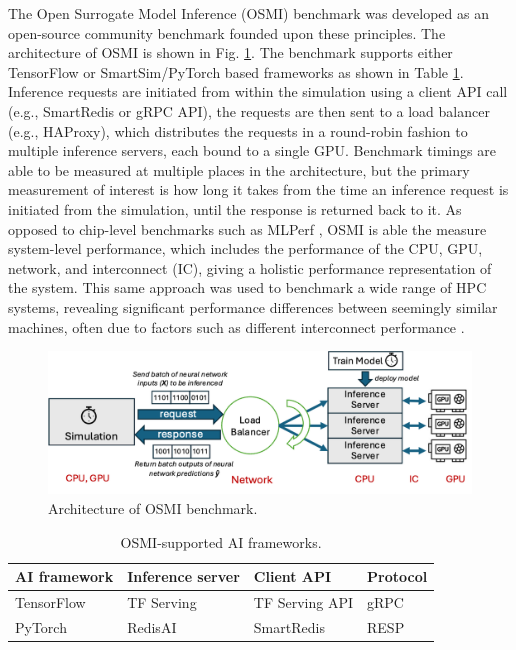 \documentclass[utf8]{FrontiersinVancouver} %
\begin{document}
The Open Surrogate Model Inference (OSMI) benchmark was developed as an open-source community benchmark founded upon these principles. The architecture of OSMI is shown in Fig. \ref{fig:osmi}. The benchmark supports either TensorFlow or SmartSim/PyTorch based frameworks as shown in Table \ref{tab:osmi}. Inference requests are initiated from within the simulation using a client API call (e.g., SmartRedis or gRPC API), the requests are then sent to a load balancer (e.g., HAProxy), which distributes the requests in a round-robin fashion to multiple inference servers, each bound to a single GPU. Benchmark timings are able to be measured at multiple places in the architecture, but the primary measurement of interest is how long it takes from the time an inference request is initiated from the simulation, until the response is returned back to it. As opposed to chip-level benchmarks such as MLPerf \cite{reddi2020mlperf}, OSMI is able the measure system-level performance, which includes the performance of the CPU, GPU, network, and interconnect (IC), giving a holistic performance representation of the system. This same approach was used to benchmark a wide range of HPC systems, revealing significant performance differences between seemingly similar machines, often due to factors such as different interconnect performance \cite{brewer2020inference}.

\begin{figure}[t]
    \centering
    \includegraphics[width=\linewidth]{images/osmi_arch.png}
    \caption{Architecture of OSMI benchmark.}
    \label{fig:osmi}
\end{figure}

\begin{table}[t]
\centering
\renewcommand{\arraystretch}{1.5}
\begin{tabular}{llll}
\hline
\textbf{AI framework} & \textbf{Inference server} & \textbf{Client API} & \textbf{Protocol} \\ \hline
TensorFlow & TF Serving  & TF Serving API  & gRPC  \\
PyTorch    & RedisAI     & SmartRedis      & RESP  \\ \hline
\end{tabular}
\caption{OSMI-supported AI frameworks.}
\label{tab:osmi}
\end{table}
\end{document}
